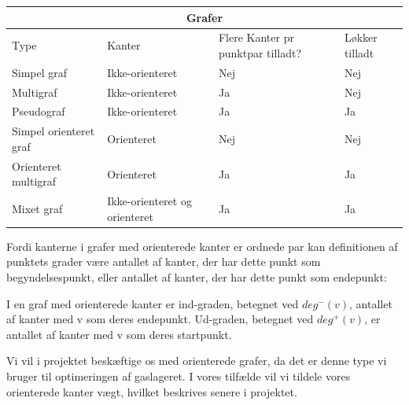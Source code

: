 \begin{tabular}{ |p{4cm}||p{3cm}|p{3cm}|p{2cm}|  }
 \hline
 \multicolumn{4}{|c|}{Grafer} \\
 \hline
 Type & Kanter & Flere Kanter pr punktpar tilladt? & Løkker tilladt\\
 \hline
 Simpel graf   & Ikke-orienteret    & Nej &   Nej\\
 Multigraf &   Ikke-orienteret & Ja   & Nej\\
 Pseudograf & Ikke-orienteret & Ja &  Ja\\
 Simpel orienteret graf    & Orienteret & Nej &  Nej\\
 Orienteret multigraf &  Orienteret  & Ja & Ja\\
 Mixet graf & Ikke-orienteret og orienteret  & Ja   & Ja\\
 \hline
\end{tabular}

Fordi kanterne i grafer med orienterede kanter er ordnede par kan definitionen af punktets grader være antallet af kanter, der har dette punkt som begyndelsespunkt, eller antallet af kanter, der har dette punkt som endepunkt:
\begin{definition}
I en graf med orienterede kanter er ind-graden, betegnet ved $deg^{-}(v)$, antallet af kanter med v som deres endepunkt. Ud-graden, betegnet ved $deg^{+}(v)$, er antallet af kanter med v som deres startpunkt.
\end{definition}
Vi vil i projektet beskæftige os med orienterede grafer, da det er denne type vi bruger til optimeringen af gaslageret. I vores tilfælde vil vi tildele vores orienterede kanter vægt, hvilket beskrives senere i projektet.